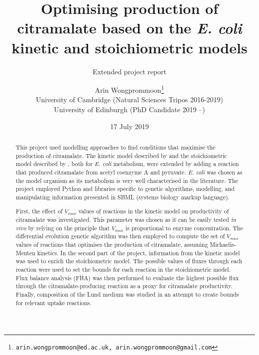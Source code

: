 \documentclass[parskip=full, numbers=noenddot]{scrreprt}
\author{Arin Wongprommoon\thanks{\texttt{arin.wongprommoon@ed.ac.uk, arin.wongprommoon@gmail.com}}
  \\University of Cambridge (Natural Sciences Tripos 2016-2019)
\\University of Edinburgh (PhD Candidate 2019 --)}
\title{Optimising production of citramalate based on the \emph{E. coli} kinetic and stoichiometric models}
\subtitle{Extended project report}
\date{17 July 2019}
\begin{document}
\maketitle

\tableofcontents

\begin{abstract}

  
  This project used modelling approaches to find conditions that maximise the production of citramalate. The kinetic model described by \citet{millard_metabolic_2017} and the stoichiometric model described by \citet{orth_comprehensive_2011}, both for \emph{E. coli} metabolism, were extended by adding a reaction that produced citramalate from acetyl coenzyme A and pyruvate. \emph{E. coli} was chosen as the model organism as its metabolism is very well characterised in the literature. The project employed Python and libraries specific to genetic algorithms, modelling, and manipulating information presented in SBML (systems biology markup language).
  
  First, the effect of $V_{max}$ values of reactions in the kinetic model on productivity of citramalate was investigated. This parameter was chosen as it can be easily tested \emph{in vivo} by relying on the principle that $V_{max}$ is proportional to enzyme concentration. The differential evolution genetic algorithm was then employed to compute the set of $V_{max}$ values of reactions that optimises the production of citramalate, assuming Michaelis-Menten kinetics. In the second part of the project, information from the kinetic model was used to enrich the stoichiometric model. The possible values of fluxes through each reaction were used to set the bounds for each reaction in the stoichiometric model. Flux balance analysis (FBA) was then performed to evaluate the highest possible flux through the citramalate-producing reaction as a proxy for citramalate productivity. Finally, composition of the Lund medium \citep{eastham_process_2015} was studied in an attempt to create bounds for relevant uptake reactions.
  
\end{abstract}
\end{document}
